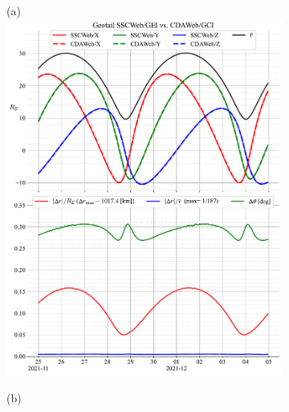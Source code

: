 \documentclass[draft]{agujournal2019}
\begin{document}
\clearpage
\begin{figure}[h]
     \begin{subfigure}[b]{0.49\textwidth}
         (a)
         \centering
         \includegraphics[width=\textwidth]{figures/Geotail_SSCWeb-GEI_vs_CDAWeb-GCI.pdf}
     \end{subfigure}
     \begin{subfigure}[b]{0.49\textwidth}
         (b)
         \centering

\end{subfigure}
\end{figure}
\end{document}

